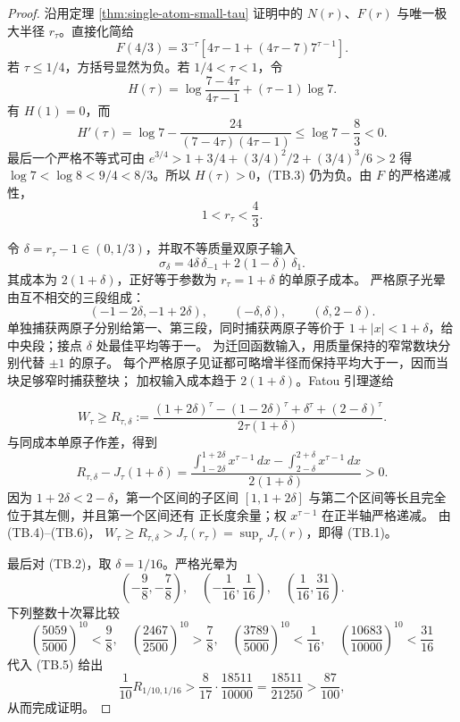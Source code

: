 \begin{proof}
沿用定理 \ref{thm:single-atom-small-tau} 证明中的 $N(r)$、$F(r)$ 与唯一极大半径 $r_\tau$。直接化简给
\[
 F(4/3)=3^{-\tau}
 \left[4\tau-1+(4\tau-7)7^{\tau-1}\right]. \tag{TB.3}
\]
若 $\tau\le1/4$，方括号显然为负。若 $1/4<\tau<1$，令
\[
 H(\tau)=\log\frac{7-4\tau}{4\tau-1}+(\tau-1)\log7.
\]
有 $H(1)=0$，而
\[
 H'(\tau)=\log7-\frac{24}{(7-4\tau)(4\tau-1)}
 \le\log7-\frac83<0.
\]
最后一个严格不等式可由 \(e^{3/4}>1+3/4+(3/4)^2/2+(3/4)^3/6>2\) 得
\(\log7<\log8<9/4<8/3\)。所以 $H(\tau)>0$，(TB.3) 仍为负。由
$F$ 的严格递减性，
\[
 1<r_\tau<\frac43. \tag{TB.4}
\]

令 $\delta=r_\tau-1\in(0,1/3)$，并取不等质量双原子输入
\[
 \sigma_\delta=4\delta\,\delta_{-1}+2(1-\delta)\,\delta_1.
\]
其成本为 $2(1+\delta)$，正好等于参数为 $r_\tau=1+\delta$ 的单原子成本。
严格原子光晕由互不相交的三段组成：
\[
 (-1-2\delta,-1+2\delta),\qquad(-\delta,\delta),\qquad
 (\delta,2-\delta).
\]
单独捕获两原子分别给第一、第三段，同时捕获两原子等价于
$1+|x|<1+\delta$，给中央段；接点 $\delta$ 处最佳平均等于一。
为迁回函数输入，用质量保持的窄常数块分别代替 $\pm1$ 的原子。
每个严格原子见证都可略增半径而保持平均大于一，因而当块足够窄时捕获整块；
加权输入成本趋于 $2(1+\delta)$。Fatou 引理遂给

\[
 W_\tau\ge R_{\tau,\delta}:=
 \frac{(1+2\delta)^\tau-(1-2\delta)^\tau+\delta^\tau+(2-\delta)^\tau}
 {2\tau(1+\delta)}. \tag{TB.5}
\]
与同成本单原子作差，得到
\[
 R_{\tau,\delta}-J_\tau(1+\delta)
 =\frac{\displaystyle\int_{1-2\delta}^{1+2\delta}x^{\tau-1}\,dx
 -\displaystyle\int_{2-\delta}^{2+\delta}x^{\tau-1}\,dx}
 {2(1+\delta)}>0. \tag{TB.6}
\]
因为 $1+2\delta<2-\delta$，第一个区间的子区间
\([1,1+2\delta]\) 与第二个区间等长且完全位于其左侧，并且第一个区间还有
正长度余量；权 $x^{\tau-1}$ 在正半轴严格递减。
由 (TB.4)--(TB.6)，
\(W_\tau\ge R_{\tau,\delta}>J_\tau(r_\tau)=\sup_rJ_\tau(r)\)，即得 (TB.1)。

最后对 (TB.2)，取 $\delta=1/16$。严格光晕为
\[
 \left(-\frac98,-\frac78\right),\quad
 \left(-\frac1{16},\frac1{16}\right),\quad
 \left(\frac1{16},\frac{31}{16}\right).
\]
下列整数十次幂比较
\[
 \left(\frac{5059}{5000}\right)^{10}<\frac98,\quad
 \left(\frac{2467}{2500}\right)^{10}>\frac78,\quad
 \left(\frac{3789}{5000}\right)^{10}<\frac1{16},\quad
 \left(\frac{10683}{10000}\right)^{10}<\frac{31}{16}
\]
代入 (TB.5) 给出
\[
 \frac1{10}R_{1/10,1/16}>\frac8{17}\cdot\frac{18511}{10000}
 =\frac{18511}{21250}>\frac{87}{100},
\]
从而完成证明。
\end{proof}
